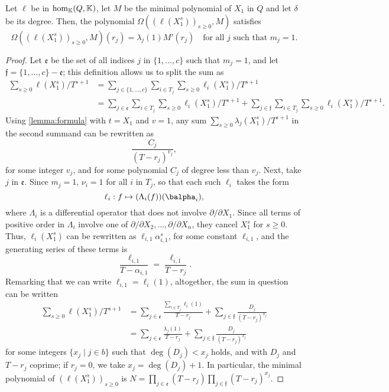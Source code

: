 \documentclass[12pt]{article}
\def\K {\ensuremath{\mathbb{K}}}
\def\K{\mathbb{K}}
\begin{document}
\begin{lemma}\label{lemma:valuelambda}
	Let $\ell$ be in ${\rm hom}_\K(Q,\K)$, let $M$ be the minimal
	polynomial of $X_1$ in $Q$ and let $\delta$ be its degree. Then, 
	the polynomial $\Omega((\ell(X_1^s))_{s\ge0},M)$ satisfies
	$$\Omega((\ell(X_1^s))_{s\ge0},M)(r_j) = \lambda_j(1) M'(r_j) \quad \text{for all $j$ such that $m_j=1$.}$$
	
\end{lemma}
\begin{proof}
	Let $\mathfrak{e}$ be the set of all indices $j$ in $\{1,\dots,c\}$
	such that $m_j=1$, and let $\mathfrak{f}=\{1,\dots,c\}-\mathfrak{e}$;
	this definition allows us to split the sum as
	\begin{align*}
	\sum_{s \ge 0} \ell(X_1^s)/T^{s+1}  
	&= \sum_{j \in \{1,\dots,c\}}\sum_{i\in T_j} 
	\sum_{s \ge 0}\ell_i(X_1^s)/T^{s+1}  \\
	&=\sum_{j \in \mathfrak{e}}\sum_{i\in T_j}\sum_{s \ge 0}  \ell_i(X_1^s)/T^{s+1} +
	\sum_{j \in \mathfrak{f}}\sum_{i\in T_j}\sum_{s \ge 0}  \ell_i(X_1^s)/T^{s+1}.
	\end{align*}
	Using \cref{lemma:formula} with $t=X_1$ and $v=1$, any sum $\sum_{s \ge 0} \lambda_j(X_1^s)/T^{s+1}$ 
	in the second summand
	can be rewritten as 
	$$\frac{C_j}{(T-r_j)^{v_j}},$$
	for some integer $v_j$, and for some polynomial $C_j$ of degree less than
	$v_j$. Next, take $j$ in $\mathfrak{e}$. Since $m_j=1$, $\nu_i=1$ for all $i$ in $T_j$,
	so that
	each such $\ell_i$ takes the form 
	$$\ell_i: f \mapsto (\Lambda_{i}(f))(\balpha_i),$$ where $\Lambda_{i}$
	is a differential operator that does not involve $\partial/\partial
	X_1$. Since all terms of positive order in $\Lambda_i$ involve one of
	$\partial/\partial X_2,\dots,\partial/\partial X_n$, they cancel
	$X_1^s$ for $s\ge 0$. Thus, $\ell_i(X_1^s)$ can be rewritten 
	as $\ell_{i,1} \alpha_{i,1}^s$, for some constant $\ell_{i,1}$,
	and the generating series of these terms is 
	$$\frac {\ell_{i,1}}{T-\alpha_{i,1}}=\frac {\ell_{i,1}}{T-r_j}.$$
	Remarking  that we can write $\ell_{i,1}=\ell_i(1)$,
	altogether, the sum in question can be written
	\begin{align*}
	\sum_{s \ge 0} \ell(X_1^s)/ T^{s+1}  
	&=\sum_{j \in \mathfrak{e}} 
	\frac{ \sum_{i\in T_j}  \ell_{i}(1) }{T-r_j }
	+ \sum_{j \in \mathfrak{f}} \frac{D_j}{(T-r_j )^{x_j}}\\
	&= \sum_{j \in \mathfrak{e}} 
	\frac{ \lambda_j(1) }{T-r_j }
	+ \sum_{j \in \mathfrak{f}} \frac{D_j}{(T-r_j )^{x_j}}
	\end{align*}
	for some integers $\{x_j \mid j \in b\}$ such that $\deg(D_j) < x_j$
	holds, and with $D_j$ and $T-r_j $ coprime; if $r_j=0$, we take
	$x_j=\deg(D_j)+1$. In particular, the minimal polynomial of
	$(\ell(X_1^s))_{s\ge 0}$ is $N=\prod_{j\in \mathfrak{e}}(T-r_j)
	\prod_{j \in \mathfrak{f}}(T-r_j)^{x_j}$.
	

\end{proof}
\end{document}
